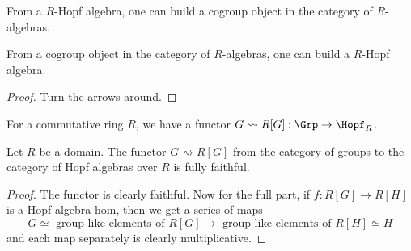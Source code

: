 \begin{proposition}
  \label{0-hopf-cogrp-alg}
  \uses{}
  \leanok

  From a $R$-Hopf algebra, one can build a cogroup object in the category of $R$-algebras.

  From a cogroup object in the category of $R$-algebras, one can build a $R$-Hopf algebra.
\end{proposition}
\begin{proof}
  \leanok

  Turn the arrows around.
\end{proof}


\begin{definition}
  \label{0-grp-alg}
  \leanok

  For a commutative ring $R$, we have a functor $G \rightsquigarrow R[G] : \Grp \to \Hopf_R$.
\end{definition}


\begin{proposition}
  \label{0-full-faithful-grp-alg}
  \leanok

  Let $R$ be a domain.
  The functor $G \rightsquigarrow R[G]$ from the category of groups to the category of Hopf algebras over $R$ is fully faithful.
\end{proposition}
\begin{proof}
  \leanok

  The functor is clearly faithful.
  Now for the full part, if $f : R[G] \to R[H]$ is a Hopf algebra hom, then we get a series of maps
  \[
    G \simeq \text{ group-like elements of } R[G] \to \text{ group-like elements of } R[H] \simeq H
  \]
  and each map separately is clearly multiplicative.
\end{proof}
